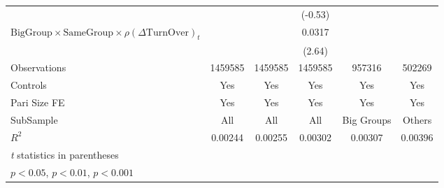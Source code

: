 {\begin{tabular}{l*{5}{c}}
                &                  &                  &  (-0.53)         &                  &                  \\
[1em]
$ {\text{BigGroup}}\times{\text{SameGroup}}\times  {\rho(\Delta \text{TurnOver})_t} $ &                  &                  &   0.0317\sym{*}  &                  &                  \\
                &                  &                  &   (2.64)         &                  &                  \\
\hline
Observations    &  1459585         &  1459585         &  1459585         &   957316         &   502269         \\
Controls        &      Yes         &      Yes         &      Yes         &      Yes         &      Yes         \\
Pari Size FE    &      Yes         &      Yes         &      Yes         &      Yes         &      Yes         \\
SubSample       &      All         &      All         &      All         &Big Groups         &   Others         \\
$ R^2$          &  0.00244         &  0.00255         &  0.00302         &  0.00307         &  0.00396         \\
\hline\hline
\multicolumn{6}{l}{\footnotesize \textit{t} statistics in parentheses}\\
\multicolumn{6}{l}{\footnotesize \sym{*} \(p<0.05\), \sym{**} \(p<0.01\), \sym{***} \(p<0.001\)}\\
\end{tabular}
}

